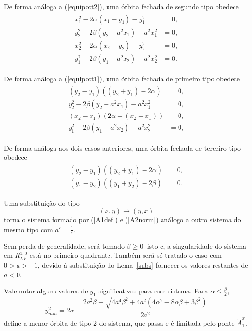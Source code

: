 De forma análoga a (\ref{equipott2}), uma órbita fechada de segundo tipo obedece 
\begin{gather}
\begin{aligned}
\label{equipott2redux}
      x_1^2 -2\alpha (x_1- y_1 )- y_1^2&=0,\\
y_2^2-2\beta(y_2-a^2x_1)- a^2 x_1^2 &=0, \\
x_2^2 -2 \alpha(  x_2-y_2)- y_2^2&=0,\\
y_1^2-2\beta(y_1-a^2x_2)- a^2 x_2^2 &=0.
\end{aligned}
\end{gather}

De forma análoga a (\ref{equipott1}), uma órbita fechada de primeiro tipo obedece
\begin{gather}
\begin{aligned}
\label{equipott1redux}
(y_2 - y_1)((y_2 + y_1)-2\alpha)&=0,
\\  y_2^2-2\beta(y_2-a^2x_1) - a^2 x_1^2&=0,
\\ ( x_2- x_1) (2\alpha -(x_2+x_1)) & =0,
\\y_1^2-2\beta(y_1-a^2x_2)- a^2 x_2^2 &=0,
\end{aligned}
\end{gather}

De forma análoga aos dois casos anteriores, uma órbita fechada de terceiro tipo obedece
\begin{gather}
\begin{aligned}
\label{equipott3redux}
(y_2 - y_1)((y_2 + y_1)-2\alpha)&=0,
\\ (y_1 - y_2)((y_1 + y_2)-2\beta)&=0.
\end{aligned}
\end{gather}

\begin{lema}
\label{subs}
Uma substituição do tipo
$$
(x,y)\longrightarrow(y,x)
$$
torna o sistema formado por (\ref{A1def}) e (\ref{A2norm}) análogo a outro sistema do mesmo tipo com $a'=\frac{1}{a}$. 
\end{lema}

Sem perda de generalidade, será tomado $\beta\geq 0$, isto é, a singularidade do sistema em $R^{1,3}_{LV}$ está no primeiro quadrante. Também será só tratado o caso com $0>a>-1$, devido à substituição do Lema~\ref{subs} fornecer os valores restantes de $a<0$.

Vale notar alguns valores de $y_1$ significativos para esse sistema. Para $\alpha\leq\frac{\beta}{2}$, 
$$
y_{min}^2 = 2\alpha -\frac{2 a^2 \beta - \sqrt{4 a^4 \beta^2 + 4 a^2 (4 \alpha^2 - 8 \alpha \beta + 3 \beta^2)}}{2 a^2}
$$
define a menor órbita de tipo 2 do sistema, que passa e é limitada pelo ponto $\tilde{A}_1^x$.

